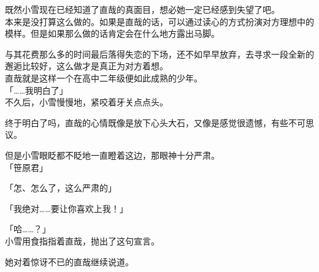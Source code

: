 既然小雪现在已经知道了直哉的真面目，想必她一定已经感到失望了吧。\\

本来是没打算这么做的。如果是直哉的话，可以通过读心的方式扮演对方理想中的模样。但是如果那么做的话肯定会在什么地方露出马脚。

与其花费那么多的时间最后落得失恋的下场，还不如早早放弃，去寻求一段全新的邂逅比较好，这么做才是真正为对方着想。\\

直哉就是这样一个在高中二年级便如此成熟的少年。\\

「……我明白了」\\

不久后，小雪慢慢地，紧咬着牙关点点头。

终于明白了吗，直哉的心情既像是放下心头大石，又像是感觉很遗憾，有些不可思议。

但是小雪眼眨都不眨地一直瞪着这边，那眼神十分严肃。\\

「笹原君」

「怎、怎么了，这么严肃的」

「我绝对……要让你喜欢上我！」

「哈……？」\\

小雪用食指指着直哉，抛出了这句宣言。

她对着惊讶不已的直哉继续说道。\\

